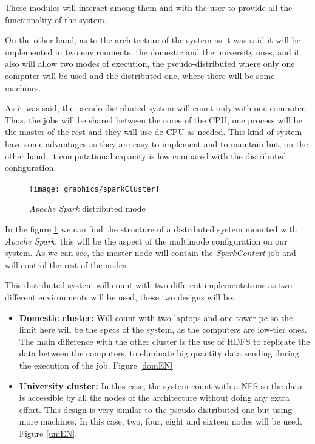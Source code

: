 These modules will interact among them and with the user to provide all the functionality of the system. 

On the other hand, as to the architecture of the system as it was said it will be implemented in two environments, the domestic and the university ones, and it also will allow two modes of execution, the pseudo-distributed where only one computer will be used and the distributed one, where there will be some machines.

As it was said, the pseudo-distributed system will count only with one computer. Thus, the jobs will be shared between the cores of the \gls{CPU}, one process will be the master of the rest and they will use de \gls{CPU} as needed. This kind of system have some advantages as they are easy to implement and to maintain but, on the other hand, it computational capacity is low compared with the distributed configuration.

\begin{figure}[htp!]
	\centering
	\caption{\textit{Apache Spark} distributed mode \cite{clusterfoto}}
	\label{fig:clusterSparkEN}
	\texttt{[image: graphics/sparkCluster]}
\end{figure} 

In the figure \ref{fig:clusterSparkEN} we can find the structure of a distributed system mounted with \textit{Apache Spark}, this will be the aspect of the multimode configuration on our system. As we can see, the master node will contain the \textit{SparkContext} job and will control the rest of the nodes.

This distributed system will count with two different implementations as two different environments will be used, these two designs will be:

\begin{itemize}
\item \textbf{Domestic cluster:} Will count with two laptops and one tower pc so the limit here will be the specs of the system, as the computers are low-tier ones. The main difference with the other cluster is the use of \gls{HDFS} to replicate the data between the computers, to eliminate big quantity data sending during the execution of the job. Figure \ref{domEN}
 
\item \textbf{University cluster:} In this case, the system count with a \gls{NFS} so the data is accessible by all the nodes of the architecture without doing any extra effort. This design is very similar to the pseudo-distributed one but using more machines. In this case, two, four, eight and sixteen nodes will be used. Figure \ref{uniEN}.
\end{itemize}

